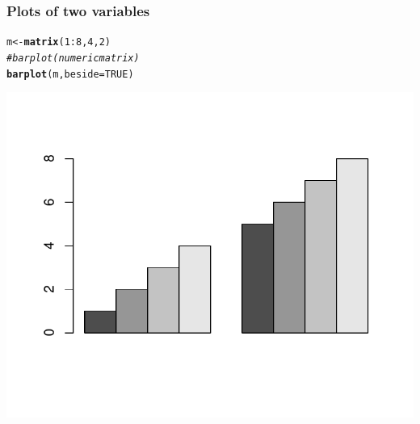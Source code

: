 \documentclass[12pt]{beamer}\usepackage[]{graphicx}\usepackage[]{color}
\makeatletter
\newcommand{\hlnum}[1]{\textcolor[rgb]{0.686,0.059,0.569}{#1}}%
\newcommand{\hlcom}[1]{\textcolor[rgb]{0.678,0.584,0.686}{\textit{#1}}}%
\newcommand{\hlopt}[1]{\textcolor[rgb]{0,0,0}{#1}}%
\newcommand{\hlstd}[1]{\textcolor[rgb]{0.345,0.345,0.345}{#1}}%
\newcommand{\hlkwb}[1]{\textcolor[rgb]{0.69,0.353,0.396}{#1}}%
\newcommand{\hlkwc}[1]{\textcolor[rgb]{0.333,0.667,0.333}{#1}}%
\newcommand{\hlkwd}[1]{\textcolor[rgb]{0.737,0.353,0.396}{\textbf{#1}}}%
\newenvironment{kframe}{%
 \def\at@end@of@kframe{}%
 \ifinner\ifhmode%
  \def\at@end@of@kframe{\end{minipage}}%
  \begin{minipage}{\columnwidth}%
 \fi\fi%
 \def\FrameCommand##1{\hskip\@totalleftmargin \hskip-\fboxsep
 \colorbox{shadecolor}{##1}\hskip-\fboxsep
     \hskip-\linewidth \hskip-\@totalleftmargin \hskip\columnwidth}%
 \MakeFramed {\advance\hsize-\width
   \@totalleftmargin\z@ \linewidth\hsize
   \@setminipage}}%
 {\par\unskip\endMakeFramed%
 \at@end@of@kframe}
\newenvironment{knitrout}{}{} %
\makeatother
\begin{document}
\begin{frame}[fragile]
\frametitle{Plots of two variables}
\begin{knitrout}\footnotesize
{}\color{fgcolor}\begin{kframe}
\begin{alltt}
\hlstd{m} \hlkwb{<-} \hlkwd{matrix}\hlstd{(}\hlnum{1}\hlopt{:}\hlnum{8}\hlstd{,} \hlnum{4}\hlstd{,} \hlnum{2}\hlstd{)}
\hlcom{# barplot (numeric matrix)}
\hlkwd{barplot}\hlstd{(m,} \hlkwc{beside} \hlstd{=} \hlnum{TRUE}\hlstd{)}
\end{alltt}
\end{kframe}

{\centering \includegraphics[width=.7\linewidth,height=.6\linewidth]{figure/unnamed-chunk-16-1} 

}



\end{knitrout}
\end{frame}

\end{document}
